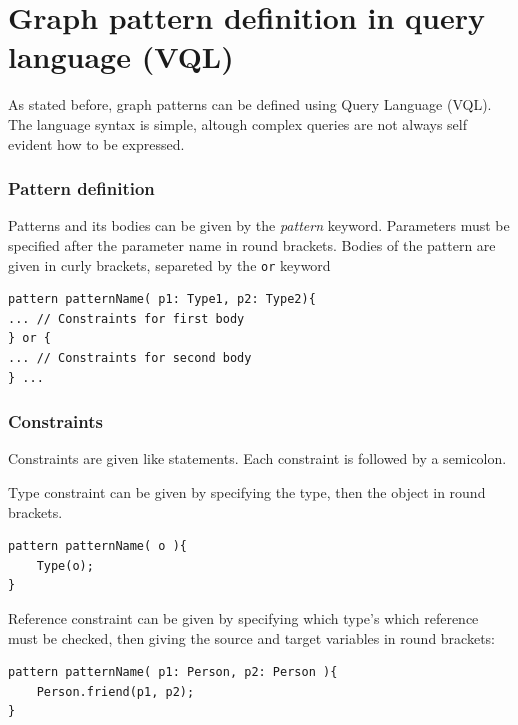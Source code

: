 \chapter{Graph pattern definition in \viatra{} query language (VQL)}

As stated before, graph patterns can be defined using \viatra{} Query Language (VQL). 
The language syntax is simple, altough complex queries are not always self evident how to be expressed.

\subsection{Pattern definition}
Patterns and its bodies can be given by the \emph{pattern} keyword. 
Parameters must be specified after the parameter name in round brackets. 
Bodies of the pattern are given in curly brackets, separeted by the \texttt{or} keyword

\begin{minipage}{\textwidth}
\begin{lstlisting}[language=vql]
pattern patternName( p1: Type1, p2: Type2){
... // Constraints for first body
} or {
... // Constraints for second body
} ...
\end{lstlisting}
\end{minipage}


\subsection{Constraints}
Constraints are given like statements. 
Each constraint is followed by a semicolon.

\vspace{\abovedisplayskip}
\begin{minipage}{\textwidth}
Type constraint can be given by specifying the type, then the object in round brackets.
\begin{lstlisting}[language=vql]
pattern patternName( o ){
	Type(o);
}
\end{lstlisting}
\end{minipage}
\vspace{\belowdisplayskip}

\begin{minipage}{\textwidth}
Reference constraint can be given by specifying which type's which reference must be checked, then giving the source and target variables in round brackets:
\begin{lstlisting}[language=vql]
pattern patternName( p1: Person, p2: Person ){
	Person.friend(p1, p2);
}
\end{lstlisting}
\end{minipage}
\vspace{\belowdisplayskip}

